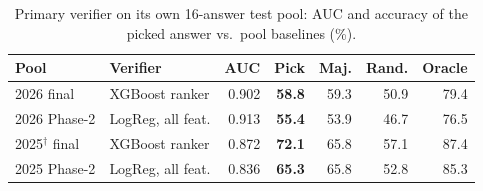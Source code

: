 \begin{table}[!t]
\centering
\footnotesize
\caption{Primary verifier on its own 16-answer test pool: AUC and accuracy of the picked answer vs.\ pool baselines (\%).}
\label{tab:ver}
\setlength{\tabcolsep}{3.5pt}
\begin{tabular}{llrrrrr}
\toprule
Pool & Verifier & AUC & Pick & Maj. & Rand. & Oracle \\
\midrule
2026 final & XGBoost ranker & 0.902 & \textbf{58.8} & 59.3 & 50.9 & 79.4 \\
2026 Phase-2 & LogReg, all feat. & 0.913 & \textbf{55.4} & 53.9 & 46.7 & 76.5 \\
2025$^\dagger$ final & XGBoost ranker & 0.872 & \textbf{72.1} & 65.8 & 57.1 & 87.4 \\
2025 Phase-2 & LogReg, all feat. & 0.836 & \textbf{65.3} & 65.8 & 52.8 & 85.3 \\
\bottomrule
\end{tabular}
\end{table}
